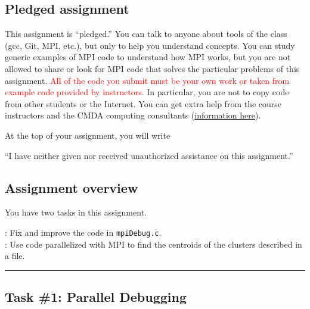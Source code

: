 
\subsection*{Pledged assignment}

This assignment is ``pledged.''
You can talk to anyone about tools of the class (gcc, Git, MPI, etc.), but only to help you understand concepts.
You can study generic examples of MPI code to understand how MPI works,
but you are not allowed to share or look for MPI code that solves the particular problems of this assignment.
\textcolor{red}{All of the code you submit must be your own work or taken from example code provided by instructors.}
In particular, you are not to copy code from other students or the Internet.
You can get extra help from the course instructors and the CMDA computing consultants (\href{https://www.ais.science.vt.edu/cmda/our-program/cmdacomputingconsultants.html}{information here}).

\vspace{8pt}\noindent At the top of your assignment, you will write
\begin{center}
``I have neither given nor received unauthorized assistance on this assignment.''
\end{center}

\subsection*{Assignment overview}

\noindent You have two tasks in this assignment.

\vspace{8pt}: Fix and improve the code in \texttt{mpiDebug.c}.
\\
\vspace{4pt}: Use code parallelized with MPI to find the centroids of the clusters described in a file.
\vspace{8pt}\hrule 

\subsection*{Task \#1: Parallel Debugging}

